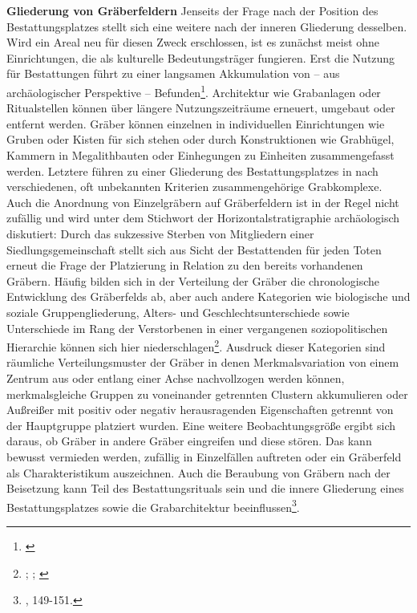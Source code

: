 \documentclass[openany,twoside,twocolumn]{book}
\let\rmarkdownfootnote\footnote%
\def\footnote{\protect\rmarkdownfootnote}
\begin{document}
\textbf{Gliederung von Gräberfeldern} \newline  Jenseits der Frage nach
der Position des Bestattungsplatzes stellt sich eine weitere nach der
inneren Gliederung desselben. Wird ein Areal neu für diesen Zweck
erschlossen, ist es zunächst meist ohne Einrichtungen, die als
kulturelle Bedeutungsträger fungieren. Erst die Nutzung für Bestattungen
führt zu einer langsamen Akkumulation von -- aus archäologischer
Perspektive -- Befunden\footnote{\textcite{koch_geschichte_1989}}.
Architektur wie Grabanlagen oder Ritualstellen können über längere
Nutzungszeiträume erneuert, umgebaut oder entfernt werden. Gräber können
einzelnen in individuellen Einrichtungen wie Gruben oder Kisten für sich
stehen oder durch Konstruktionen wie Grabhügel, Kammern in
Megalithbauten oder Einhegungen zu Einheiten zusammengefasst werden.
Letztere führen zu einer Gliederung des Bestattungsplatzes in nach
verschiedenen, oft unbekannten Kriterien zusammengehörige Grabkomplexe.
Auch die Anordnung von Einzelgräbern auf Gräberfeldern ist in der Regel
nicht zufällig und wird unter dem Stichwort der Horizontalstratigraphie
archäologisch diskutiert: Durch das sukzessive Sterben von Mitgliedern
einer Siedlungsgemeinschaft stellt sich aus Sicht der Bestattenden für
jeden Toten erneut die Frage der Platzierung in Relation zu den bereits
vorhandenen Gräbern. Häufig bilden sich in der Verteilung der Gräber die
chronologische Entwicklung des Gräberfelds ab, aber auch andere
Kategorien wie biologische und soziale Gruppengliederung, Alters- und
Geschlechtsunterschiede sowie Unterschiede im Rang der Verstorbenen in
einer vergangenen soziopolitischen Hierarchie können sich hier
niederschlagen\footnote{\textcite{derks_geschlechtsspezifische_1993};
  \textcite{mchugh_theoretical_1999}; \textcite{veit_tod_1997}}.
Ausdruck dieser Kategorien sind räumliche Verteilungsmuster der Gräber
in denen Merkmalsvariation von einem Zentrum aus oder entlang einer
Achse nachvollzogen werden können, merkmalsgleiche Gruppen zu
voneinander getrennten Clustern akkumulieren oder Außreißer mit positiv
oder negativ herausragenden Eigenschaften getrennt von der Hauptgruppe
platziert wurden. Eine weitere Beobachtungsgröße ergibt sich daraus, ob
Gräber in andere Gräber eingreifen und diese stören. Das kann bewusst
vermieden werden, zufällig in Einzelfällen auftreten oder ein Gräberfeld
als Charakteristikum auszeichnen. Auch die Beraubung von Gräbern nach
der Beisetzung kann Teil des Bestattungsrituals sein und die innere
Gliederung eines Bestattungsplatzes sowie die Grabarchitektur
beeinflussen\footnote{\textcite{hofmann_rituelle_2008}, 149-151.}.
\end{document}
